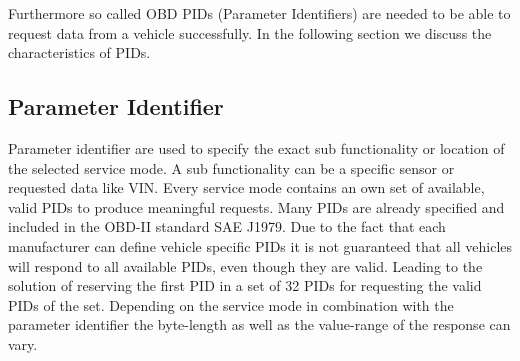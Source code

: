 Furthermore so called OBD PIDs (Parameter Identifiers) are needed to be able to request data from a vehicle successfully. In the following section 
we discuss the characteristics of PIDs.

\subsection{Parameter Identifier}
Parameter identifier are used to specify the exact sub functionality or location of the selected service mode. A sub functionality can
be a specific sensor or requested data like VIN. Every service mode contains an own set of available, valid PIDs to produce meaningful requests. Many PIDs are 
already specified and included in the OBD-II standard SAE J1979. Due to the fact that each manufacturer can define vehicle specific PIDs it is not 
guaranteed that all vehicles will respond to all available PIDs, even though they are valid. Leading to the solution of reserving the first PID in a 
set of 32 PIDs for requesting the valid PIDs of the set. Depending on the service mode in combination with the parameter identifier the byte-length 
as well as the value-range of the response can vary. 


